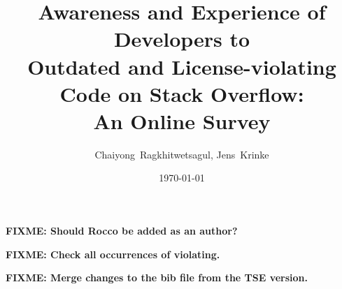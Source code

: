 \documentclass{svjour3}                     %
\newcommand\FIXME[1]{\textbf{FIXME: #1}}
\begin{document}
\title{Awareness and Experience of Developers to\\ Outdated and License-violating Code on Stack Overflow:\\ An Online Survey}


\author{Chaiyong~Ragkhitwetsagul, Jens~Krinke}


\institute{Chaiyong Ragkhitwetsagul~(\Letter), Jens Krinke \at
              Computer Science Department., University College London, UK \\
              Tel.: +44 (0)20 7679,  Fax: +44 (0)20 7387 1397\\
              \email{\{ucabagk, j.krinke\}@ucl.ac.uk}           %
}

\date{\today}


\maketitle

\FIXME{Should Rocco be added as an author?}

\FIXME{Check all occurrences of violating.}

\FIXME{Merge changes to the bib file from the TSE version.}
\end{document}
